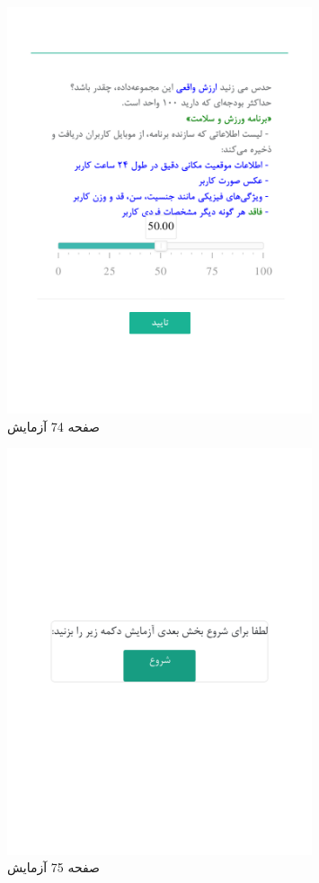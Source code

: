 \begin{figure}[htpb]
    \centering
    \includegraphics[width=0.8\textwidth]{./img/Task74.png}
    \caption{ صفحه 74 آزمایش }
    \label{fig:Task74}
\end{figure}


\begin{figure}[htpb]
    \centering
    \includegraphics[width=0.8\textwidth]{./img/Task75.png}
    \caption{ صفحه 75 آزمایش }
    \label{fig:Task75}
\end{figure}


